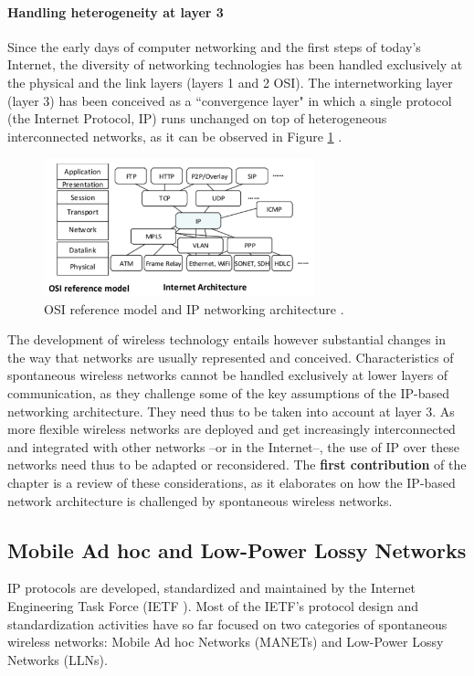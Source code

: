 \paragraph{Handling heterogeneity at layer 3} Since the early days of computer networking and the first steps of today's Internet, the diversity of networking technologies has been handled exclusively at the physical and the link layers (layers 1 and 2 OSI). The internetworking layer (layer 3) has been conceived as a ``convergence layer" in which a single protocol (the Internet Protocol, IP) runs unchanged on top of heterogeneous interconnected networks, as it can be observed in Figure \ref{f:conv} \cite{miya}.

\begin{figure}[ht]	%
\centering
\includegraphics[width=0.7\textwidth]{Figures/protostack-crop.pdf} %
\caption{OSI reference model and IP networking architecture \cite{miya}.}
\label{f:conv}
\end{figure}
%
The development of wireless technology entails however substantial changes in the way that networks are usually represented and conceived. Characteristics of spontaneous wireless networks cannot be handled exclusively at lower layers of communication, as they challenge some of the key assumptions of the IP-based networking architecture. They need thus to be taken into account at layer 3. As more flexible wireless networks are deployed and get increasingly interconnected and integrated with other networks --or in the Internet--, the use of IP over these networks need thus to be adapted or reconsidered. The {\bf first contribution} of the chapter is a review of these considerations, as it elaborates on how the IP-based network architecture is challenged by spontaneous wireless networks.
%
\subsection{Mobile Ad hoc and Low-Power Lossy Networks}
\label{ss:manet_lln}
%
IP protocols are developed, standardized and maintained by the Internet Engineering Task Force (IETF \cite{IETF}). Most of the IETF's protocol design and standardization activities have so far focused on two categories of spontaneous wireless networks: Mobile Ad hoc Networks (MANETs) and Low-Power Lossy Networks (LLNs).

